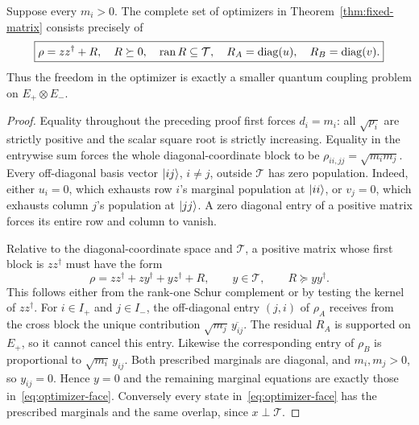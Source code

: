 \begin{theorem}\label{thm:optimizer-face}
Suppose every $m_i>0$. The complete set of optimizers in Theorem~\ref{thm:fixed-matrix} consists precisely of
\begin{equation}\label{eq:optimizer-face}
 \boxed{\rho=zz^\dagger+R,\quad R\succeq0,\quad
 \operatorname{ran}R\subseteq\mathcal T,\quad
 R_A=\operatorname{diag}(u),\quad R_B=\operatorname{diag}(v).}
\end{equation}
Thus the freedom in the optimizer is exactly a smaller quantum coupling problem on $E_+\otimes E_-$.
\end{theorem}
\begin{proof}
Equality throughout the preceding proof first forces $d_i=m_i$: all $\sqrt{p_i}$ are strictly positive and the scalar square root is strictly increasing. Equality in the entrywise sum forces the whole diagonal-coordinate block to be $\rho_{ii,jj}=\sqrt{m_i m_j}$. Every off-diagonal basis vector $\lvert ij\rangle$, $i\ne j$, outside $\mathcal T$ has zero population. Indeed, either $u_i=0$, which exhausts row $i$'s marginal population at $\lvert ii\rangle$, or $v_j=0$, which exhausts column $j$'s population at $\lvert jj\rangle$. A zero diagonal entry of a positive matrix forces its entire row and column to vanish.

Relative to the diagonal-coordinate space and $\mathcal T$, a positive matrix whose first block is $zz^\dagger$ must have the form
\[
 \rho=zz^\dagger+zy^\dagger+yz^\dagger+R,
 \qquad y\in\mathcal T,\qquad R\succeq yy^\dagger.
\]
This follows either from the rank-one Schur complement or by testing the kernel of $zz^\dagger$. For $i\in I_+$ and $j\in I_-$, the off-diagonal entry $(j,i)$ of $\rho_A$ receives from the cross block the unique contribution $\sqrt{m_j}\,\overline{y_{ij}}$. The residual $R_A$ is supported on $E_+$, so it cannot cancel this entry. Likewise the corresponding entry of $\rho_B$ is proportional to $\sqrt{m_i}\,y_{ij}$. Both prescribed marginals are diagonal, and $m_i,m_j>0$, so $y_{ij}=0$. Hence $y=0$ and the remaining marginal equations are exactly those in~\eqref{eq:optimizer-face}. Conversely every state in~\eqref{eq:optimizer-face} has the prescribed marginals and the same overlap, since $x\perp\mathcal T$.
\end{proof}

